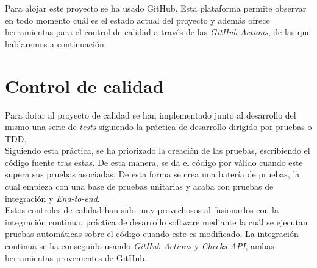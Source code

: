 Para alojar este proyecto se ha usado GitHub. Esta plataforma permite observar en todo momento cuál es el estado actual del proyecto y además ofrece herramientas para el control de calidad
a través de las \textit{GitHub Actions}, de las que hablaremos a continuación.


\section {Control de calidad}

Para dotar al proyecto de calidad se han implementado junto al desarrollo del mismo una serie de \textit{tests} siguiendo la práctica de desarrollo dirigido por pruebas o TDD.\\

Siguiendo esta práctica, se ha priorizado la creación de las pruebas, escribiendo el código fuente tras estas. De esta manera, se da el código por válido cuando este supera sus pruebas asociadas.
De esta forma se crea una batería de pruebas, la cual empieza con una base de pruebas unitarias y acaba con pruebas de integración y \textit{End-to-end}.\\

Estos controles de calidad han sido muy provechosos al fusionarlos con la integración continua, práctica de desarrollo software mediante la cuál se ejecutan pruebas automáticas sobre el código cuando este es modificado.
La integración continua se ha conseguido usando \textit{GitHub Actions} y \textit{Checks API}, ambas herramientas provenientes de GitHub.
